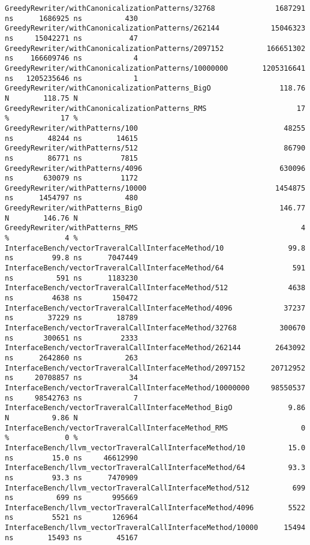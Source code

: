 \begin{code}
\begin{verbatim}
GreedyRewriter/withCanonicalizationPatterns/32768              1687291 ns      1686925 ns          430
GreedyRewriter/withCanonicalizationPatterns/262144            15046323 ns     15042271 ns           47
GreedyRewriter/withCanonicalizationPatterns/2097152          166651302 ns    166609746 ns            4
GreedyRewriter/withCanonicalizationPatterns/10000000        1205316641 ns   1205235646 ns            1
GreedyRewriter/withCanonicalizationPatterns_BigO                118.76 N        118.75 N
GreedyRewriter/withCanonicalizationPatterns_RMS                     17 %            17 %
GreedyRewriter/withPatterns/100                                  48255 ns        48244 ns        14615
GreedyRewriter/withPatterns/512                                  86790 ns        86771 ns         7815
GreedyRewriter/withPatterns/4096                                630096 ns       630079 ns         1172
GreedyRewriter/withPatterns/10000                              1454875 ns      1454797 ns          480
GreedyRewriter/withPatterns_BigO                                146.77 N        146.76 N
GreedyRewriter/withPatterns_RMS                                      4 %             4 %
InterfaceBench/vectorTraveralCallInterfaceMethod/10               99.8 ns         99.8 ns      7047449
InterfaceBench/vectorTraveralCallInterfaceMethod/64                591 ns          591 ns      1183230
InterfaceBench/vectorTraveralCallInterfaceMethod/512              4638 ns         4638 ns       150472
InterfaceBench/vectorTraveralCallInterfaceMethod/4096            37237 ns        37229 ns        18789
InterfaceBench/vectorTraveralCallInterfaceMethod/32768          300670 ns       300651 ns         2333
InterfaceBench/vectorTraveralCallInterfaceMethod/262144        2643092 ns      2642860 ns          263
InterfaceBench/vectorTraveralCallInterfaceMethod/2097152      20712952 ns     20708857 ns           34
InterfaceBench/vectorTraveralCallInterfaceMethod/10000000     98550537 ns     98542763 ns            7
InterfaceBench/vectorTraveralCallInterfaceMethod_BigO             9.86 N          9.86 N
InterfaceBench/vectorTraveralCallInterfaceMethod_RMS                 0 %             0 %
InterfaceBench/llvm_vectorTraveralCallInterfaceMethod/10          15.0 ns         15.0 ns     46612990
InterfaceBench/llvm_vectorTraveralCallInterfaceMethod/64          93.3 ns         93.3 ns      7470909
InterfaceBench/llvm_vectorTraveralCallInterfaceMethod/512          699 ns          699 ns       995669
InterfaceBench/llvm_vectorTraveralCallInterfaceMethod/4096        5522 ns         5521 ns       126964
InterfaceBench/llvm_vectorTraveralCallInterfaceMethod/10000      15494 ns        15493 ns        45167

\end{verbatim}
\end{code}
